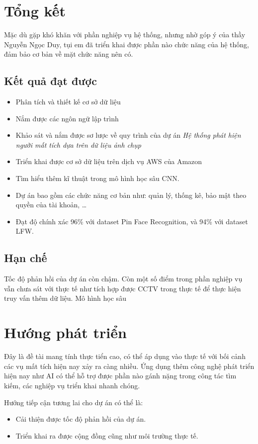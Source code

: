 \documentclass[../DoAn.tex]{subfiles}
\begin{document}
\section{Tổng kết}
Mặc dù gặp khó khăn với phần nghiệp vụ hệ thống, nhưng nhờ góp ý của thầy Nguyễn Ngọc Duy, tụi em đã triển khai được phần nào chức năng của hệ thống, đảm bảo cơ bản về mặt chức năng nên có.
\subsection{Kết quả đạt được}
\begin{itemize}
	\item Phân tích và thiết kế cơ sở dữ liệu
	\item Nắm được các ngôn ngữ lập trình
	\item Khảo sát và nắm được sơ lược về quy trình của dự án \textit{Hệ thống phát hiện người mất tích dựa trên dữ liệu ảnh chụp}
	\item Triển khai được cơ sở dữ liệu trên dịch vụ AWS của Amazon
	\item Tìm hiểu thêm kĩ thuật trong mô hình học sâu CNN.
	\item Dự án bao gồm các chức năng cơ bản như: quản lý, thống kê, bảo mật theo quyền của tài khoản, \dots
	\item Đạt độ chính xác 96\% với dataset Pin Face Recognition, và 94\% với dataset LFW.
\end{itemize}
\subsection{Hạn chế}
Tốc độ phản hồi của dự án còn chậm. Còn một số điểm trong phần nghiệp vụ vẫn chưa sát với thực tế như tích hợp được CCTV trong thực tế để thực hiện truy vấn thêm dữ liệu. Mô hình học sâu
\section{Hướng phát triển}
Đây là đề tài mang tính thực tiển cao, có thể áp dụng vào thực tế với bối cảnh các vụ mất tích hiện nay xảy ra càng nhiều. Ứng dụng thêm công nghệ phát triển hiện nay như AI có thể hỗ trợ được phần nào gánh nặng trong công tác tìm kiếm, các nghiệp vụ triển khai nhanh chóng.

Hướng tiếp cận tương lai cho dự án có thể là:
\begin{itemize}
	\item Cải thiện được tốc độ phản hồi của dự án.
	\item Triển khai ra được cộng đồng cũng như môi trường thực tế.
\end{itemize}
\end{document}
